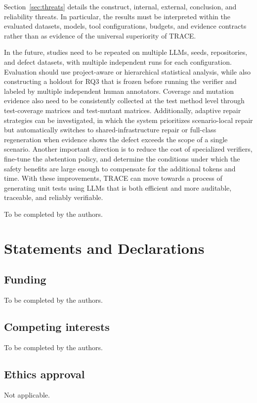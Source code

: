 \documentclass[pdflatex,sn-basic,Numbered,iicol]{sn-jnl}
\begin{document}
Section~\ref{sec:threats} details the construct, internal, external, conclusion, and reliability threats. In particular, the results must be interpreted within the evaluated datasets, models, tool configurations, budgets, and evidence contracts rather than as evidence of the universal superiority of TRACE.

In the future, studies need to be repeated on multiple LLMs, seeds, repositories, and defect datasets, with multiple independent runs for each configuration. Evaluation should use project-aware or hierarchical statistical analysis, while also constructing a holdout for RQ3 that is frozen before running the verifier and labeled by multiple independent human annotators. Coverage and mutation evidence also need to be consistently collected at the test method level through test-coverage matrices and test-mutant matrices. Additionally, adaptive repair strategies can be investigated, in which the system prioritizes scenario-local repair but automatically switches to shared-infrastructure repair or full-class regeneration when evidence shows the defect exceeds the scope of a single scenario. Another important direction is to reduce the cost of specialized verifiers, fine-tune the abstention policy, and determine the conditions under which the safety benefits are large enough to compensate for the additional tokens and time. With these improvements, TRACE can move towards a process of generating unit tests using LLMs that is both efficient and more auditable, traceable, and reliably verifiable.

\backmatter

To be completed by the authors.

\section*{Statements and Declarations}

\subsection*{Funding}
To be completed by the authors.

\subsection*{Competing interests}
To be completed by the authors.

\subsection*{Ethics approval}
Not applicable.
\end{document}
